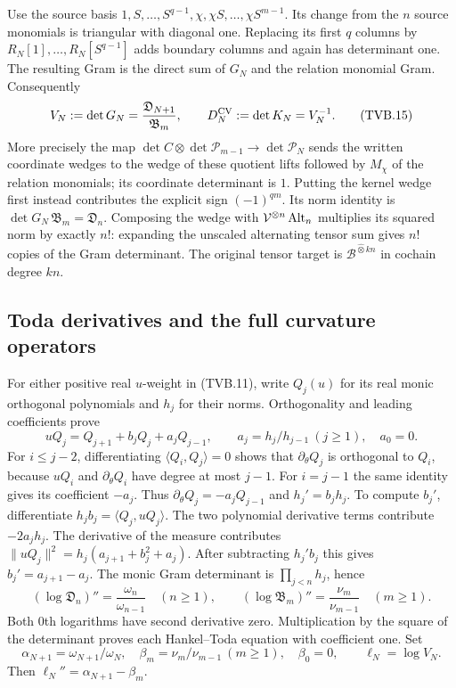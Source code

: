 Use the source basis
$1,S,\ldots,S^{q-1},\chi,\chi S,\ldots,\chi S^{m-1}$.
Its change from the $n$ source monomials is triangular with
diagonal one. Replacing its first $q$ columns by $R_N[1],
\ldots,R_N[S^{q-1}]$ adds boundary columns and again has
determinant one. The resulting Gram is the direct sum of $G_N$
and the relation monomial Gram. Consequently
\[
 V_N:=\det G_N=\frac{\mathfrak D_{N+1}}{\mathfrak B_m},
 \qquad D_N^{\rm CV}:=\det K_N=V_N^{-1}.
 \tag{TVB.15}
\]
More precisely the map
$\det C\otimes\det\mathcal P_{m-1}\to\det\mathcal P_N$
sends the written coordinate wedges to the wedge of these quotient
lifts followed by $M_\chi$ of the relation monomials; its coordinate
determinant is $1$. Putting the kernel wedge first instead contributes
the explicit sign $(-1)^{qm}$. Its norm identity is
$\det G_N\,\mathfrak B_m=\mathfrak D_n$.
Composing the wedge with $\mathcal V^{\otimes n}\operatorname{Alt}_n$
multiplies its squared norm by exactly $n!$: expanding the unscaled
alternating tensor sum gives $n!$ copies of the Gram determinant.
The original tensor target is $\mathscr B^{\widehat\otimes kn}$
in cochain degree $kn$.

\subsection[\hspace{0.4em}Toda derivatives and the full curvature operators]{Toda derivatives and the full curvature operators}

For either positive real $u$-weight in (TVB.11), write $Q_j(u)$
for its real monic orthogonal polynomials and $h_j$ for their
norms. Orthogonality and leading coefficients prove
\[
 uQ_j=Q_{j+1}+b_jQ_j+a_jQ_{j-1},\qquad
 a_j=h_j/h_{j-1}\ (j\ge1),\quad a_0=0.
\]
For $i\le j-2$, differentiating $\langle Q_i,Q_j\rangle=0$
shows that $\partial_\theta Q_j$ is orthogonal to $Q_i$, because
$uQ_i$ and $\partial_\theta Q_i$ have degree at most $j-1$.
For $i=j-1$ the same identity gives its coefficient $-a_j$.
Thus $\partial_\theta Q_j=-a_jQ_{j-1}$ and $h_j'=b_jh_j$.
To compute $b_j'$, differentiate $h_jb_j=\langle Q_j,uQ_j\rangle$.
The two polynomial derivative terms contribute $-2a_jh_j$.
The derivative of the measure contributes
$\|uQ_j\|^2=h_j(a_{j+1}+b_j^2+a_j)$.
After subtracting $h_j'b_j$ this gives $b_j'=a_{j+1}-a_j$.
The monic Gram determinant is $\prod_{j<n}h_j$, hence
\[
 (\log\mathfrak D_n)''
 =\frac{\omega_n}{\omega_{n-1}}\quad(n\ge1),\qquad
 (\log\mathfrak B_m)''=\frac{\nu_m}{\nu_{m-1}}\quad(m\ge1).
 \tag{TVB.16}
\]
Both $0$th logarithms have second derivative zero.
Multiplication by the square of the determinant proves each
Hankel--Toda equation with coefficient one.
Set
\[
 \alpha_{N+1}=\omega_{N+1}/\omega_N,\quad
 \beta_m=\nu_m/\nu_{m-1}\ (m\ge1),\quad\beta_0=0,
 \qquad\ell_N=\log V_N.
\]
Then $\ell_N''=\alpha_{N+1}-\beta_m$.


